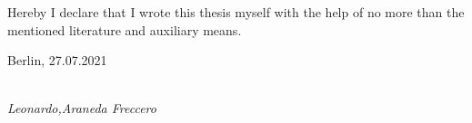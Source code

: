 \newpage

\thispagestyle{empty}

\begin{large}

\vspace*{6cm}

\noindent
Hereby I declare that I wrote this thesis myself with the help of no more than the mentioned literature and auxiliary means.
\vspace{2cm}

\noindent
Berlin, 27.07.2021

\vspace{3cm}

\hspace*{7cm}%
\dotfill\\
\hspace*{8.2cm}%
\textit{Leonardo,Araneda Freccero}

\end{large}

